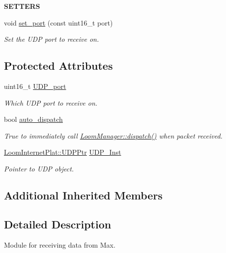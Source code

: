 \begin{Indent}{\bf S\+E\+T\+T\+E\+RS}\par
\begin{DoxyCompactItemize}
\item 
void \hyperlink{class_loom___max_sub_a68aeec383e7bc3d7fd5886d32eb21409}{set\+\_\+port} (const uint16\+\_\+t port)
\begin{DoxyCompactList}\small\item\em Set the U\+DP port to receive on. \end{DoxyCompactList}\end{DoxyCompactItemize}
\end{Indent}
\subsection*{Protected Attributes}
\begin{DoxyCompactItemize}
\item 
uint16\+\_\+t \hyperlink{class_loom___max_sub_a0b60c2de2c1a5e2259cc5723edd9d51c}{U\+D\+P\+\_\+port}
\begin{DoxyCompactList}\small\item\em Which U\+DP port to receive on. \end{DoxyCompactList}\item 
bool \hyperlink{class_loom___max_sub_adb1bf0c7394ff4ebaa1e893fb55356ff}{auto\+\_\+dispatch}
\begin{DoxyCompactList}\small\item\em True to immediately call \hyperlink{class_loom_manager_a80fb13974b3bde9b0cedcd43732d7226}{Loom\+Manager\+::dispatch()} when packet received. \end{DoxyCompactList}\item 
\hyperlink{class_loom_internet_plat_a0b2cc742a6ac5f4f7054b75ea99b345c}{Loom\+Internet\+Plat\+::\+U\+D\+P\+Ptr} \hyperlink{class_loom___max_sub_aa41703fadde1c5aca2c265eba0e2d13e}{U\+D\+P\+\_\+\+Inst}
\begin{DoxyCompactList}\small\item\em Pointer to U\+DP object. \end{DoxyCompactList}\end{DoxyCompactItemize}
\subsection*{Additional Inherited Members}


\subsection{Detailed Description}
Module for receiving data from Max. 

